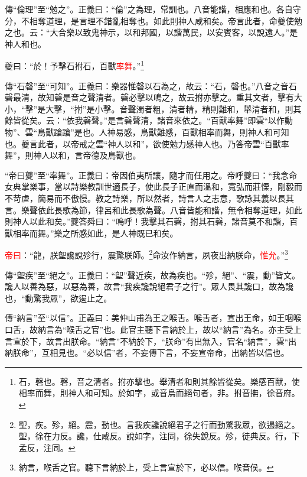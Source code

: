 {\noindent\zhuan{}\fzbyks 傳“倫理”至“勉之”。正義曰：“倫”之為理，常訓也。八音能諧，相應和也。各自守分，不相奪道理，是言理不錯亂相奪也。如此則神人咸和矣。帝言此者，命夔使勉之也。云：“大合樂以致鬼神示，以和邦國，以諧萬民，以安賓客，以說遠人。”是神人和也。 \par}

夔曰：“於！予擊石拊石，百獸\textcolor{red}{率舞}。”\footnote{石，磬也。磬，音之清者。拊亦擊也。舉清者和則其餘皆從矣。樂感百獸，使相率而舞，則神人和可知。於如字，或音烏而絕句者，非。拊音撫，徐音府。}

{\noindent\zhuan{}\fzbyks 傳“石磬”至“可知”。正義曰：樂器惟磬以石為之，故云：“石，磬也。”八音之音石磬最清，故知磬是音之聲清者。磬必擊以鳴之，故云拊亦擊之。重其文者，擊有大小，“擊”是大擊，“拊”是小擊。音聲濁者粗，清者精，精則難和，舉清者和，則其餘皆從矣。云：“依我磬聲。”是言磬聲清，諸音來依之。“百獸率舞”即雲“以作動物”、雲“鳥獸蹌蹌”是也。人神易感，鳥獸難感，百獸相率而舞，則神人和可知也。夔言此者，以帝戒之雲“神人以和”，欲使勉力感神人也。乃答帝雲“百獸率舞”，則神人以和，言帝德及鳥獸也。 \par}

{\noindent\shu{}\fzkt “帝曰夔”至“率舞”。正義曰：帝因伯夷所讓，隨才而任用之。帝呼夔曰：“我念命女典掌樂事，當以詩樂教訓世適長子，使此長子正直而溫和，寬弘而莊慄，剛毅而不苛虐，簡易而不傲慢。教之詩樂，所以然者，詩言人之志意，歌詠其義以長其言。樂聲依此長歌為節，律呂和此長歌為聲。八音皆能和諧，無令相奪道理，如此則神人以此和矣。”夔答舜曰：“嗚呼！我擊其石磬，拊其石磬，諸音莫不和諧，百獸相率而舞。”樂之所感如此，是人神既已和矣。 \par}

\textcolor{red}{帝曰}：“龍，朕堲讒說殄行，震驚朕師。\footnote{堲，疾。殄，絕。震，動也。言我疾讒說絕君子之行而動驚我眾，欲遏絕之。堲，徐在力反。讒，仕咸反。說如字，注同，徐失銳反。殄，徒典反。行，下孟反，注同。}命汝作納言，夙夜出納朕命，\textcolor{red}{惟允}。”\footnote{納言，喉舌之官。聽下言納於上，受上言宣於下，必以信。喉音侯。}

{\noindent\zhuan{}\fzbyks 傳“堲疾”至“絕之”。正義曰：“堲”聲近疾，故為疾也。“殄，絕”、“震，動”皆文。讒人以善為惡，以惡為善，故言“我疾讒說絕君子之行”。眾人畏其讒口，故為讒也，“動驚我眾”，欲遏止之。 \par}

{\noindent\zhuan{}\fzbyks 傳“納言”至“以信”。正義曰：美仲山甫為王之喉舌。喉舌者，宣出王命，如王咽喉口舌，故納言為“喉舌之官”也。此官主聽下言納於上，故以“納言”為名。亦主受上言宣於下，故言出朕命。“納言”不納於下，“朕命”有出無入，官名“納言”，雲“出納朕命”，互相見也。“必以信”者，不妄傳下言，不妄宣帝命，出納皆以信也。 \par}

